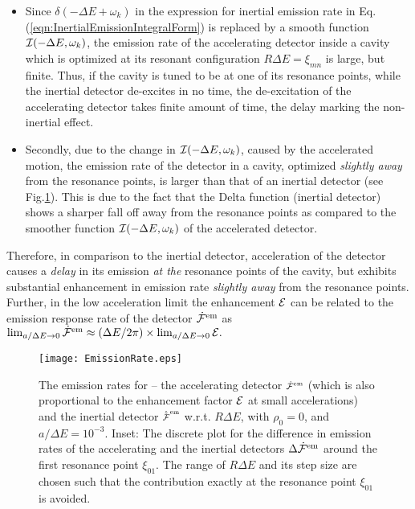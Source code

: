 \documentclass[aps,prl,nofootinbib,preprintnumbers,floatfix,twocolumn,superscriptaddress]{revtex4}
\begin{document}
\begin{itemize}
\item Since $\delta(-\Delta E+\omega_{k})$ 
in the expression for inertial emission rate 
in Eq.(\ref{eqn:InertialEmissionIntegralForm}) is replaced by a smooth function 
${\cal I}(-\Delta E,\omega_k)$,
the emission rate of the accelerating detector inside a cavity which is optimized at 
its resonant configuration $R \Delta E=\xi_{mn}$ is large, but finite. Thus, if the cavity 
is tuned to be at one of its resonance 
points, while the inertial detector de-excites in no time, the de-excitation of the 
accelerating detector takes finite amount of time, the delay marking the non-inertial effect.

\item Secondly, due to the change in ${\cal I}(-\Delta E, \omega_k)$, caused by 
the accelerated motion, the emission rate of the 
detector in a cavity, optimized {\it slightly away} from the 
resonance points, is larger than that of an inertial detector (see Fig.\ref{fig:De-excitationRate}). 
This is due to the fact that the Delta function (inertial detector) shows a sharper fall 
off away from the resonance points as compared to the smoother function
${\cal I}(-\Delta E, \omega_k)$ of the accelerated detector. 
\end{itemize}
Therefore, in comparison to the inertial detector, acceleration of the detector causes a 
{\it delay} in its emission {\it at the} resonance points of the cavity, but exhibits substantial 
enhancement in emission rate {\it slightly away} from the resonance points. 
Further, in the low acceleration limit the enhancement ${\cal E}$ can be related to the emission 
response rate of the detector ${\dot {\cal F}}^{\rm em}$ as
$\lim_{a/\Delta E \to 0} {\dot {\cal F}}^{\rm em} \approx 
(\Delta E/2\pi) \times \lim_{a/\Delta E \to 0} {\cal E}.$
\begin{figure}[!htb]
\begin{center}
\texttt{[image: EmissionRate.eps]} 
\caption{The emission rates for -- the accelerating detector 
${\scriptstyle {\dot {\cal F}}^{\rm em}}$ (which is also proportional to the 
enhancement factor ${\cal E}$ at small accelerations)
and the inertial detector ${\scriptstyle {\dot {\tilde {\cal F}}}^{\rm em}}$
w.r.t. $R\Delta E$, with $\rho_0=0$, and $a/\Delta E=10^{-3}$. 
Inset: The discrete plot for the difference in emission rates of the 
accelerating and the inertial 
detectors $\Delta {\dot {\cal F}}^{\rm em}$ around the first resonance point 
$\xi_{01}$.
The range of $R\Delta E$ and its step size are chosen such that the contribution exactly
at the resonance point $\xi_{01}$ is avoided.} 
\label{fig:De-excitationRate}
\end{center}
\end{figure}
\end{document}
